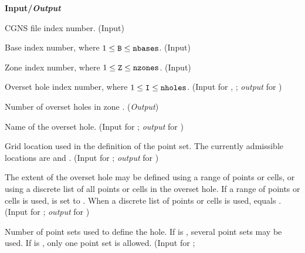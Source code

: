 \noindent
\textbf{\textcolor{input}{Input}/\textcolor{output}{\textit{Output}}}

\begin{Ventryi}{}\raggedright
\item [\fort{fn}]
      CGNS file index number.
      (\textcolor{input}{Input})
\item [\fort{B}]
      Base index number, where $1 \leq \text{{\normalfont\texttt{B}}} \leq \text{{\normalfont\texttt{nbases}}}$.
      (\textcolor{input}{Input})
\item [\fort{Z}]
      Zone index number, where $1 \leq \text{{\normalfont\texttt{Z}}} \leq \text{{\normalfont\texttt{nzones}}}$.
      (\textcolor{input}{Input})
\item [\fort{I}]
      Overset hole index number, where $1 \leq \text{{\normalfont\texttt{I}}} \leq \text{{\normalfont\texttt{nholes}}}$.
      (\textcolor{input}{Input} for ,
      ;
      \textcolor{output}{\textit{output}} for )
\item [\fort{nholes}]
      Number of overset holes in zone .
      (\textcolor{output}{\textit{Output}})
\item [\fort{holename}]
      Name of the overset hole.
      (\textcolor{input}{Input} for ;
      \textcolor{output}{\textit{output}} for )
\item [\fort{location}]
      Grid location used in the definition of the point set.
      The currently admissible locations are  and
      .
      (\textcolor{input}{Input} for ;
      \textcolor{output}{\textit{output}} for )
\item [\fort{ptset\_type}]
      The extent of the overset hole may be defined using a range of
      points or cells, or using a discrete list of all points or cells
      in the overset hole.
      If a range of points or cells is used,  is set
      to .
      When a discrete list of points or cells is used,
       equals .
      (\textcolor{input}{Input} for ;
      \textcolor{output}{\textit{output}} for )
\item [\fort{nptsets}]
      Number of point sets used to define the hole.
      If  is , several point sets
      may be used.
      If  is , only one point set
      is allowed.
      (\textcolor{input}{Input} for ;

\end{Ventryi}
